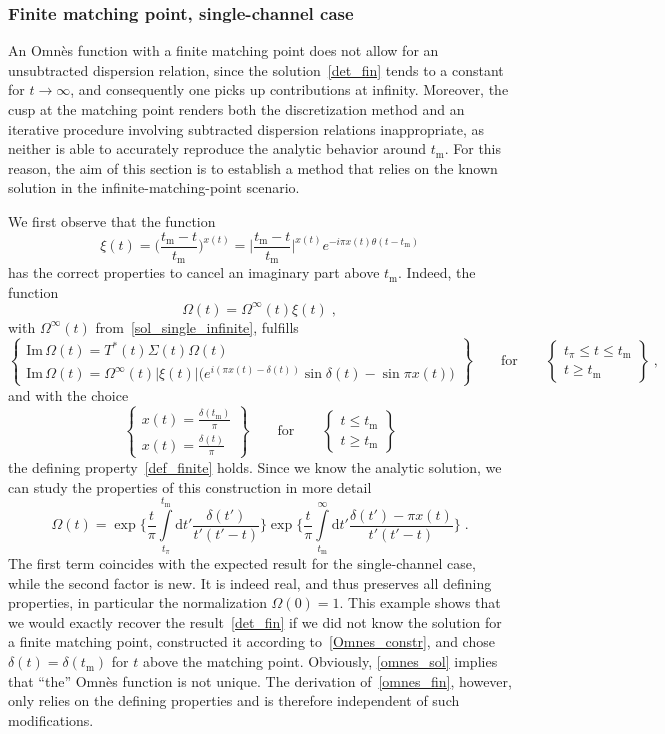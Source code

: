 \documentclass[11pt]{article}%
\providecommand{\ec}{\;,}
\providecommand{\ep}{\;.}
\newcommand{\diff}{\text{d}}
\newcommand{\tpi}{t_\pi}
\newcommand{\tm}{t_\text{m}}
\newcommand{\beq}{\begin{equation}}
\newcommand{\eeq}{\end{equation}}
\renewcommand{\Im}{\text{Im}\,}
\begin{document}
\subsubsection{Finite matching point, single-channel case}
\label{sec:fmp_single}

An Omn\`es function with a finite matching point does not allow for an unsubtracted dispersion relation, since the solution~\eqref{det_fin}
tends to a constant for $t\to\infty$, and consequently one picks up contributions at infinity. Moreover, the cusp at the matching point renders both the discretization method and an iterative procedure involving subtracted dispersion relations inappropriate, as neither is able to accurately reproduce the analytic behavior around $\tm$. For this reason, the aim of this section is to establish a method that relies on the known solution in the infinite-matching-point scenario.

We first observe that the function
\beq
\xi(t)=\bigg(\frac{\tm-t}{\tm}\bigg)^{x(t)}=\bigg|\frac{\tm-t}{\tm}\bigg|^{x(t)}e^{-i\pi x(t)\theta(t-\tm)}
\eeq
has the correct properties to cancel an imaginary part above $\tm$. Indeed, the function
\beq
\label{Omnes_constr}
\Omega(t)=\Omega^\infty(t)\xi(t)\ec
\eeq
with $\Omega^\infty(t)$ from~\eqref{sol_single_infinite}, fulfills
\beq
\begin{Bmatrix}\Im \Omega(t)=T^*(t)\Sigma(t)\Omega(t) \\ 
\Im \Omega(t)=\Omega^\infty(t)|\xi(t)|\Big(e^{i(\pi x(t)-\delta(t))}\sin\delta(t)-\sin\pi x(t)\Big)\end{Bmatrix}
\qquad \text{for} \qquad
\begin{Bmatrix}\tpi\leq t \leq \tm \\ t\geq\tm\end{Bmatrix}\ec
\eeq
and with the choice
\beq
\begin{Bmatrix}x(t)=\frac{\delta(\tm)}{\pi} \\ 
x(t)=\frac{\delta(t)}{\pi}\end{Bmatrix}
\qquad \text{for} \qquad
\begin{Bmatrix}t \leq \tm \\ t\geq\tm\end{Bmatrix}
\eeq
the defining property~\eqref{def_finite} holds. Since we know the analytic solution, we can study the properties of this construction in more detail
\beq
\label{omnes_sol}
\Omega(t)=\exp\Bigg\{\frac{t}{\pi}\int\limits_{\tpi}^{\tm}\diff t'\frac{\delta(t')}{t'(t'-t)}\Bigg\}
\exp\Bigg\{\frac{t}{\pi}\int\limits_{\tm}^{\infty}\diff t'\frac{\delta(t')-\pi x(t)}{t'(t'-t)}\Bigg\}\ep
\eeq
The first term coincides with the expected result for the single-channel case, while the second factor is new. It is indeed real, and thus preserves all defining properties, in particular the normalization $\Omega(0)=1$. This example shows that we would exactly recover the result~\eqref{det_fin} if we did not know the solution for a finite matching point, constructed it according to~\eqref{Omnes_constr}, and chose $\delta(t)=\delta(\tm)$ for $t$ above the matching point. Obviously, \eqref{omnes_sol} implies that ``the'' Omn\`es function is not unique. The derivation of~\eqref{omnes_fin}, however, only relies on the defining properties and is therefore independent of such modifications.
\end{document}
